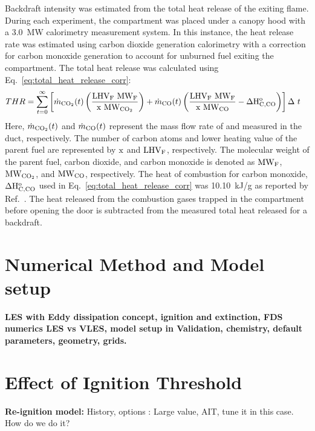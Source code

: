 \documentclass[12pt,letterpaper]{article}
\begin{document}
\begin{flushleft}
Backdraft intensity was estimated from the total heat release of the exiting flame. During each experiment, the compartment was placed under a canopy hood with a 3.0~MW calorimetry measurement system. In this instance, the heat release rate was estimated using carbon dioxide generation calorimetry with a correction for carbon monoxide generation to account for unburned fuel exiting the compartment. The total heat release was calculated using Eq.~\ref{eq:total_heat_release_corr}:
\begin{equation}
\begin{split}
\label{eq:total_heat_release_corr}
THR&=\sum_{t=0}^{\infty} \left[ \dot{m}_{\rm{CO_2}}(t)\left(\frac{\rm{LHV_F}~\rm{MW_F}}{\rm{x}~\rm{MW_{CO_2}}}\right)+\dot{m}_{\rm{CO}}(t)\left(\frac{\rm{LHV_F}~\rm{MW_F}}{\rm{x}~\rm{MW_{CO}}}-\Delta\rm{H}^{\rm{o}}_{C,CO}\right) \right] \Delta~t
\end{split}
\end{equation}
Here, $\dot{m}_{\rm{CO_2}}(t)$ and $\dot{m}_{\rm{CO}}(t)$ represent the mass flow rate of  and  measured in the duct, respectively. The number of carbon atoms and lower heating value of the parent fuel are represented by $\rm{x}$ and $\rm{LHV_F}$, respectively. The molecular weight of the parent fuel, carbon dioxide, and carbon monoxide is denoted as $\rm{MW_F}$, $\rm{MW_{CO_2}}$, and $\rm{MW_{CO}}$, respectively. The heat of combustion for carbon monoxide, $\Delta \rm{H}^{\rm{o}}_{C,CO}$ used in Eq.~\ref{eq:total_heat_release_corr} was 10.10~kJ/g as reported by Ref.~\cite{Hurley2016}. The heat released from the combustion gases trapped in the compartment before opening the door is subtracted from the measured total heat released for a backdraft.

\section{Numerical Method and Model setup}

\textbf{LES with Eddy dissipation concept, ignition and extinction, FDS numerics  LES vs VLES, model setup in Validation, chemistry, default parameters, geometry, grids.}



\section{Effect of Ignition Threshold}

\textbf{Re-ignition model:} History, options : Large value, AIT, tune it in this case. How do we do it?


\end{flushleft}
\end{document}
